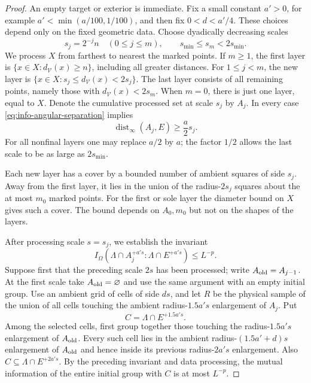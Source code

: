 \documentclass[11pt]{article}
\numberwithin{equation}{section}
\theoremstyle{definition}
\theoremstyle{remark}
\begin{document}
\begin{proof}
An empty target or exterior is immediate.  Fix a small constant
$a'>0$, for example $a'<\min(a/100,1/100)$, and then fix
$0<d<a'/4$.  These choices depend only on the fixed geometric data.
Choose dyadically decreasing scales
\[
 s_j=2^{-j}n\quad(0\le j\le m),
 \qquad s_{\min}\le s_m<2s_{\min}.
\]
We process $X$ from farthest to nearest the marked points.  If $m\ge1$,
the first layer is $\{x\in X:d_{\mathcal V}(x)\ge n\}$, including all
greater distances.  For $1\le j<m$, the new layer is
$\{x\in X:s_j\le d_{\mathcal V}(x)<2s_j\}$.  The last layer consists
of all remaining points, namely those with
$d_{\mathcal V}(x)<2s_m$.  When $m=0$, there is just one layer, equal
to $X$.  Denote the cumulative processed set at scale $s_j$ by $A_j$.
In every case \eqref{eq:info-angular-separation} implies
\begin{equation}
 \operatorname{dist}_\infty(A_j,E)\ge \frac a2 s_j.
 \label{eq:info-cumulative-separation}
\end{equation}
For all nonfinal layers one may replace $a/2$ by $a$; the factor $1/2$
allows the last scale to be as large as $2s_{\min}$.

Each new layer has a cover by a bounded number of ambient squares of
side $s_j$.  Away from the first layer, it lies in the union of the
radius-$2s_j$ squares about the at most $m_0$ marked points.  For the
first or sole layer the diameter bound on $X$ gives such a cover.
The bound depends on $A_0,m_0$ but not on the shapes of the layers.

After processing scale $s=s_j$, we establish the invariant
\begin{equation}
 I_\Omega(\Lambda\cap A_j^{+a's}:\Lambda\cap E^{+a's})\le L^{-p}.
 \label{eq:info-annular-invariant}
\end{equation}
Suppose first that the preceding scale $2s$ has been processed; write
$A_{\rm old}=A_{j-1}$.  At the first scale take
$A_{\rm old}=\varnothing$ and use the same argument with an empty
initial group.  Use an ambient grid of cells of side $ds$, and let
$R$ be the physical sample of the union of all cells touching the
ambient radius-$1.5a's$ enlargement of $A_j$.  Put
\[
 C=\Lambda\cap E^{+1.5a's}.
\]
Among the selected cells, first group together those touching the
radius-$1.5a's$ enlargement of $A_{\rm old}$.  Every such cell lies in
the ambient radius-$(1.5a'+d)s$ enlargement of $A_{\rm old}$ and hence
inside its previous radius-$2a's$ enlargement.  Also
$C\subseteq\Lambda\cap E^{+2a's}$.  By the preceding invariant and data
processing, the mutual information of the entire initial group with
$C$ is at most $L^{-p}$.


\end{proof}
\end{document}
